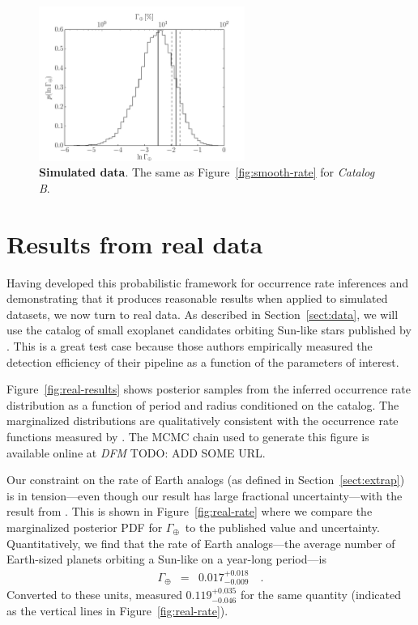 \documentclass[12pt,preprint]{aastex}
\newcommand{\Fig}[1]{Figure~\ref{fig:#1}}
\newcommand{\fig}[1]{\Fig{#1}}
\newcommand{\figlabel}[1]{\label{fig:#1}}
\newcommand{\Sect}[1]{Section~\ref{sect:#1}}
\newcommand{\sect}[1]{\Sect{#1}}
\newcommand{\todo}[3]{{\color{#2} \emph{#1} TODO: #3}}
\newcommand{\dfmtodo}[1]{\todo{DFM}{red}{#1}}
\newcommand{\rate}{\ensuremath{\Gamma}}
\newcommand{\modelb}{\emph{Catalog B}}
\newcommand{\gammaearth}{{\ensuremath{\rate_\oplus}}}
\begin{document}
\begin{figure}[p]
\begin{center}
\includegraphics[width=0.6\textwidth]{figures/simulation/rate.pdf}
\end{center}
\caption{%
{\bf Simulated data}.
The same as \fig{smooth-rate} for \modelb.
\figlabel{simulation-rate}}
\end{figure}

\section{Results from real data}

Having developed this probabilistic framework for occurrence rate inferences
and demonstrating that it produces reasonable results when applied to
simulated datasets, we now turn to real data.
As described in \sect{data}, we will use the catalog of small exoplanet
candidates orbiting Sun-like stars published by \citet{petigura}.
This is a great test case because those authors empirically measured the
detection efficiency of their pipeline as a function of the parameters of
interest.

\Fig{real-results} shows posterior samples from the inferred occurrence rate
distribution as a function of period and radius conditioned on the catalog.
The marginalized distributions are qualitatively consistent with the
occurrence rate functions measured by \citet{petigura}.
The MCMC chain used to generate this figure is available online at
\dfmtodo{ADD SOME URL}.

Our constraint on the rate of Earth analogs (as defined in \sect{extrap}) is
in tension---even though our result has large fractional uncertainty---with
the result from \citet{petigura}.
This is shown in \fig{real-rate} where we compare the marginalized posterior
PDF for \gammaearth\ to the published value and uncertainty.
Quantitatively, we find that the rate of Earth analogs---the average number of
Earth-sized planets orbiting a Sun-like on a year-long period---is
\begin{eqnarray}
\gammaearth &=& 0.017^{+0.018}_{-0.009} \quad.
\end{eqnarray}
Converted to these units, \citet{petigura} measured $0.119_{-0.046}^{+0.035}$
for the same quantity (indicated as the vertical lines in \fig{real-rate}).
\end{document}

